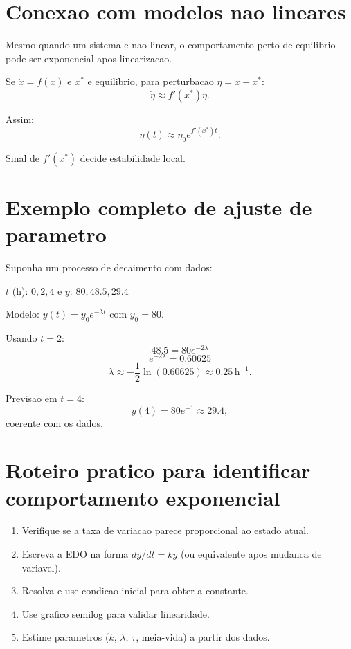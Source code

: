 \documentclass[12pt,a4paper,oneside]{book}
\theoremstyle{definition}
\begin{document}
\section{Conexao com modelos nao lineares}

Mesmo quando um sistema e nao linear, o comportamento perto de equilibrio pode ser exponencial apos linearizacao.

Se $\dot{x}=f(x)$ e $x^*$ e equilibrio, para perturbacao $\eta=x-x^*$:
\begin{equation}
\dot{\eta}\approx f'(x^*)\eta.
\end{equation}

Assim:
\begin{equation}
\eta(t)\approx \eta_0e^{f'(x^*)t}.
\end{equation}

Sinal de $f'(x^*)$ decide estabilidade local.

\section{Exemplo completo de ajuste de parametro}

Suponha um processo de decaimento com dados:
\begin{center}
$t$ (h): $0, 2, 4$ \quad e \quad $y$: $80, 48.5, 29.4$
\end{center}

Modelo: $y(t)=y_0e^{-\lambda t}$ com $y_0=80$.

Usando $t=2$:
\begin{equation}
48.5 = 80e^{-2\lambda}
\end{equation}
\begin{equation}
e^{-2\lambda}=0.60625
\end{equation}
\begin{equation}
\lambda\approx -\frac{1}{2}\ln(0.60625)\approx 0.25\,\text{h}^{-1}.
\end{equation}

Previsao em $t=4$:
\begin{equation}
y(4)=80e^{-1}\approx 29.4,
\end{equation}
coerente com os dados.

\section{Roteiro pratico para identificar comportamento exponencial}

\begin{enumerate}
    \item Verifique se a taxa de variacao parece proporcional ao estado atual.
    \item Escreva a EDO na forma $dy/dt=ky$ (ou equivalente apos mudanca de variavel).
    \item Resolva e use condicao inicial para obter a constante.
    \item Use grafico semilog para validar linearidade.
    \item Estime parametros ($k$, $\lambda$, $\tau$, meia-vida) a partir dos dados.
\end{enumerate}
\end{document}
